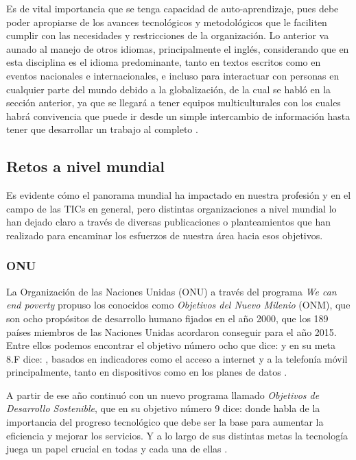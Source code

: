 \noindent Es de vital importancia que se tenga capacidad de auto-aprendizaje, pues debe poder apropiarse de los avances tecnológicos y metodológicos que le faciliten cumplir con las necesidades y restricciones de la organización. Lo anterior va aunado al manejo de otros idiomas, principalmente el inglés, considerando que en esta disciplina es el idioma predominante, tanto en textos escritos como en eventos nacionales e internacionales, e incluso para interactuar con personas en cualquier parte del mundo debido a la globalización, de la cual se habló en la sección anterior, ya que se llegará a tener equipos multiculturales con los cuales habrá convivencia que puede ir desde un simple intercambio de información hasta tener que desarrollar un trabajo al completo \cite{redis:2016}.


\subsection{Retos a nivel mundial}

Es evidente cómo el panorama mundial ha impactado en nuestra profesión y en el campo de las TICs en general, pero distintas organizaciones a nivel mundial lo han dejado claro a través de diversas publicaciones o planteamientos que han realizado para encaminar los esfuerzos de nuestra área hacia esos objetivos.

\subsubsection{ONU}
La Organización de las Naciones Unidas (ONU) a través del programa \textit{We can end poverty} propuso los conocidos como \textit{Objetivos del Nuevo Milenio} (ONM), que son ocho propósitos de desarrollo humano fijados en el año 2000, que los 189 países miembros de las Naciones Unidas acordaron conseguir para el año 2015. Entre ellos podemos encontrar el objetivo número ocho que dice:  y en su meta 8.F dice: , basados en indicadores como el acceso a internet y a la telefonía móvil principalmente, tanto en dispositivos como en los planes de datos \cite{onu:2000}.
\vspace{5mm}

\noindent A partir de ese año continuó con un nuevo programa llamado \textit{Objetivos de Desarrollo Sostenible}, que en su objetivo número 9 dice:  donde habla de la importancia del progreso tecnológico que debe ser la base para aumentar la eficiencia y mejorar los servicios. Y a lo largo de sus distintas metas la tecnología juega un papel crucial en todas y cada una de ellas \cite{onu:2015}.

